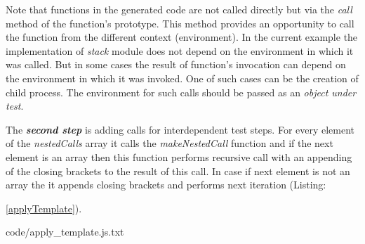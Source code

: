 Note that functions in the generated code are not called directly but via the \textit{call} method of the function's prototype. This method provides an opportunity to call the function from the different context (environment). In the current example the implementation of \textit{stack} module does not depend on the environment in which it was called. But in some cases the result of function's invocation can depend on the environment in which it was invoked. One of such cases can be the creation of child process. The environment for such calls should be passed as an \textit{object under test}.


The \textit{\textbf{second step}} is adding calls for interdependent test steps. For every  element of the \textit{nestedCalls} array it calls the  \textit{makeNestedCall} function and if the next element is an array then this function performs recursive call with an appending of the closing brackets to the result of this call. In case if next element is not an array the it appends closing brackets and performs next iteration (Listing: {\ref{applyTemplate}).




{code/apply_template.js.txt}


%
%


}
